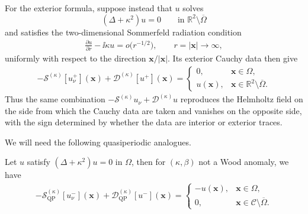 For the exterior formula, suppose instead that \(u\) solves
\[
  (\Delta+\kappa^2)u=0
  \qquad \text{in }\mathbb{R}^2\setminus\overline{\Omega}
\]
and satisfies the two-dimensional Sommerfeld radiation condition
\begin{align}
  \frac{\partial u}{\partial r}-\ii\kappa u
  =o\bigl(r^{-1/2}\bigr),
  \qquad r=|\mathbf{x}|\to\infty,
  \label{eq:sommerfeld-radiation-appendix}
\end{align}
uniformly with respect to the direction \(\mathbf{x}/|\mathbf{x}|\). Its
exterior Cauchy data then give
\begin{align}
  -\mathcal{S}^{(\kappa)}[u_\nu^+](\mathbf{x})
  +\mathcal{D}^{(\kappa)}[u^+](\mathbf{x})
  =
  \begin{cases}
    0, & \mathbf{x}\in\Omega,\\
    u(\mathbf{x}), & \mathbf{x}\in\mathbb{R}^2\setminus\overline{\Omega}.
  \end{cases}
  \label{eq:green-representation-exterior}
\end{align}
Thus the same combination \(-\mathcal{S}^{(\kappa)}u_\nu+
\mathcal{D}^{(\kappa)}u\) reproduces the Helmholtz field on the side from
which the Cauchy data are taken and vanishes on the opposite side, with the
sign determined by whether the data are interior or exterior traces.

We will need the following quasiperiodic analogues.

\begin{lemma}
\label{lem:qp-interior-green-representation}
Let $u$ satisfy $(\Delta+\kappa^2)u=0$ in $\Omega$, then for $(\kappa, \beta)$ not a Wood anomaly, we have\begin{align}
  -\mathcal{S}^{(\kappa)}_\mathrm{QP}[u_\nu^-](\mathbf{x})
  +\mathcal{D}^{(\kappa)}_\mathrm{QP}[u^-](\mathbf{x})
  =
  \begin{cases}
    -u(\mathbf{x}), & \mathbf{x}\in\Omega,\\
    0, & \mathbf{x}\in \mathcal{C}\setminus\overline{\Omega}.
  \end{cases}
\end{align}
\end{lemma}

